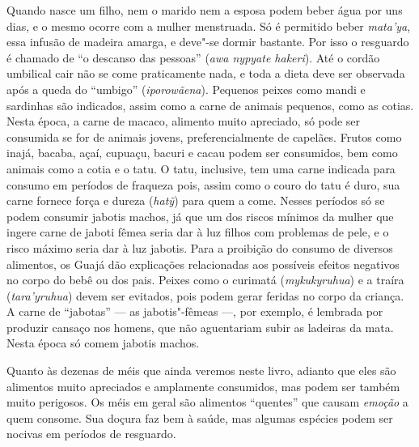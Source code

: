 Quando nasce um filho, nem o marido nem a esposa podem beber água por
uns dias, e o mesmo ocorre com a mulher menstruada. Só é permitido beber
\emph{mata'ya}, essa infusão de madeira amarga, e deve"-se dormir
bastante. Por isso o resguardo é chamado de ``o descanso das pessoas''
(\emph{awa nypyate hakeri}). Até o cordão umbilical cair não se come
praticamente nada, e toda a dieta deve ser observada após a queda do
``umbigo'' (\emph{iporowãena}). Pequenos peixes como mandi e sardinhas são
indicados, assim como a carne de animais pequenos, como as cotias. Nesta
época, a carne de macaco, alimento muito apreciado, só pode ser
consumida se for de animais jovens, preferencialmente de capelães.
Frutos como inajá, bacaba, açaí, cupuaçu, bacuri e cacau podem ser
consumidos, bem como animais como a cotia e o tatu. O tatu, inclusive,
tem uma carne indicada para consumo em períodos de fraqueza pois, assim
como o couro do tatu é duro, sua carne fornece força e dureza
(\emph{hatỹ}) para quem a come. Nesses períodos só se podem consumir
jabotis machos, já que um dos riscos mínimos da mulher que ingere carne
de jaboti fêmea seria dar à luz filhos com problemas de pele, e o risco
máximo seria dar à luz jabotis. Para a proibição do consumo de diversos
alimentos, os Guajá dão explicações relacionadas aos possíveis efeitos
negativos no corpo do bebê ou dos pais. Peixes como o curimatá
(\emph{mykukyruhua}) e a traíra (\emph{tara'yruhua}) devem ser evitados,
pois podem gerar feridas no corpo da criança. A carne de ``jabotas'' ---
as jabotis"-fêmeas ---, por exemplo, é lembrada por produzir cansaço nos
homens, que não aguentariam subir as ladeiras da mata. Nesta época só
comem jabotis machos.

Quanto às dezenas de méis que ainda veremos neste livro, adianto que
eles são alimentos muito apreciados e amplamente consumidos, mas podem
ser também muito perigosos. Os méis em geral são alimentos ``quentes'' que
causam \emph{emoção} a quem consome. Sua doçura faz bem à saúde, mas
algumas espécies podem ser nocivas em períodos de resguardo.




